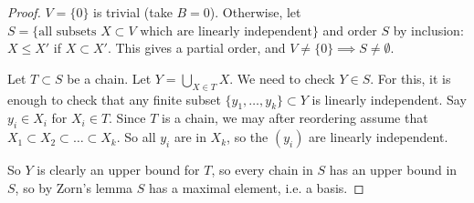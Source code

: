 \documentclass{article}
\theoremstyle{definition}
\begin{document}
\begin{proof}
    $V = \{0\}$ is trivial (take $B=0$). Otherwise, let $S= \{\text{all subsets }X \subset V \text{ which are linearly independent}\}$ and order $S$ by inclusion: $X\le X'$ if $X \subset X'$. This gives a partial order, and $V \neq \{0\} \implies S \neq \emptyset$. 

    Let $T \subset S$ be a chain. Let $Y = \bigcup_{X \in T} X$. We need to check $Y \in S$. For this, it is enough to check that any finite subset $\{y_1,\ldots,y_k\} \subset Y$ is linearly independent. Say $y_i \in X_i$ for $X_i \in T$. Since $T$ is a chain, we may after reordering assume that $X_1 \subset X_2 \subset \ldots \subset X_k$. So all $y_i$ are in $X_k$, so the $(y_i)$ are linearly independent.

    \vspace{1mm}
    
    So $Y$ is clearly an upper bound for $T$, so every chain in $S$ has an upper bound in $S$, so by Zorn's lemma $S$ has a maximal element, i.e. a basis.
\end{proof}
\end{document}

